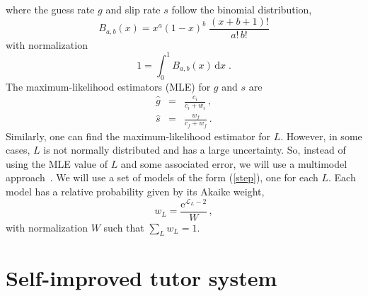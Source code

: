\documentclass[11pt,letterpaper]{article}
\begin{document}
%
where the guess rate $g$ and slip rate $s$ follow the binomial distribution,
%
\begin{equation}
       B_{a,b}(x) = x^a (1-x)^b\; \frac{(x+b+1)!}{a!\, b!} 
\end{equation}
%
with normalization
%
\begin{equation}
      1=\int_0^1 B_{a,b}(x) \,\mathrm{d}x \; .
\end{equation} 
%
The maximum-likelihood estimators (MLE) for $g$ and $s$ are
%
\begin{eqnarray}
  \hat{g} &=&  \frac{c_i}{c_i+w_i} \, ,\\
  \hat{s} &=&  \frac{w_f}{c_f+w_f} \,  .
\end{eqnarray}
%
Similarly, one can find the maximum-likelihood estimator
for $L$.  However, in some cases, $L$ is not normally
distributed and has a large uncertainty.
So, instead of using the MLE value of $L$ and some
associated error, we will use a multimodel approach~\cite{aic-book}.
We will use a set of models of the form (\ref{step}), 
one for each $L$. Each model has a relative probability given 
by its Akaike weight,  
%
\begin{equation}
                   w_L = \frac{\mathrm{e}^{\mathcal{L}_L-2}}{W}\, ,
\end{equation}
%
with normalization $W$ such that $\sum_L w_L=1$.

%
%
%

\section{Self-improved tutor system}
\end{document}
